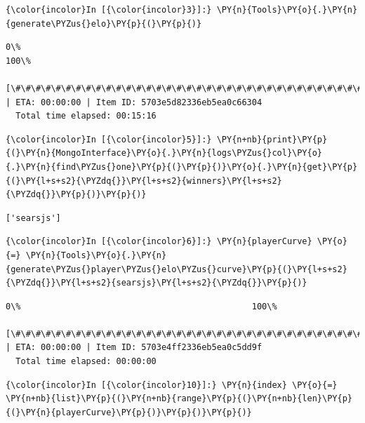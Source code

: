 \begin{Verbatim}[commandchars=\\\{\}]
  {\color{incolor}In [{\color{incolor}3}]:} \PY{n}{Tools}\PY{o}{.}\PY{n}{generate\PYZus{}elo}\PY{p}{(}\PY{p}{)}
\end{Verbatim}

\begin{Verbatim}[commandchars=\\\{\}]
  0\%                                                                  100\%
  [\#\#\#\#\#\#\#\#\#\#\#\#\#\#\#\#\#\#\#\#\#\#\#\#\#\#\#\#\#\#\#\#\#\#\#\#\#\#\#\#\#\#\#\#\#\#\#\#\#\#\#\#\#\#\#\#\#\#\#\#\#\#\#\#\#\#\#\#\#\#] | ETA: 00:00:00 | Item ID: 5703e5d82336eb5ea0c66304
  Total time elapsed: 00:15:16
\end{Verbatim}

\begin{Verbatim}[commandchars=\\\{\}]
  {\color{incolor}In [{\color{incolor}5}]:} \PY{n+nb}{print}\PY{p}{(}\PY{n}{MongoInterface}\PY{o}{.}\PY{n}{logs\PYZus{}col}\PY{o}{.}\PY{n}{find\PYZus{}one}\PY{p}{(}\PY{p}{)}\PY{o}{.}\PY{n}{get}\PY{p}{(}\PY{l+s+s2}{\PYZdq{}}\PY{l+s+s2}{winners}\PY{l+s+s2}{\PYZdq{}}\PY{p}{)}\PY{p}{)}
\end{Verbatim}

\begin{Verbatim}[commandchars=\\\{\}]
  ['searsjs']
\end{Verbatim}

\begin{Verbatim}[commandchars=\\\{\}]
  {\color{incolor}In [{\color{incolor}6}]:} \PY{n}{playerCurve} \PY{o}{=} \PY{n}{Tools}\PY{o}{.}\PY{n}{generate\PYZus{}player\PYZus{}elo\PYZus{}curve}\PY{p}{(}\PY{l+s+s2}{\PYZdq{}}\PY{l+s+s2}{searsjs}\PY{l+s+s2}{\PYZdq{}}\PY{p}{)}
\end{Verbatim}

\begin{Verbatim}[commandchars=\\\{\}]
  0\%                                              100\%
  [\#\#\#\#\#\#\#\#\#\#\#\#\#\#\#\#\#\#\#\#\#\#\#\#\#\#\#\#\#\#\#\#\#\#\#\#\#\#\#\#\#\#\#\#\#\#\#\#\#\#] | ETA: 00:00:00 | Item ID: 5703e4ff2336eb5ea0c5dd9f
  Total time elapsed: 00:00:00
\end{Verbatim}

\begin{Verbatim}[commandchars=\\\{\}]
  {\color{incolor}In [{\color{incolor}10}]:} \PY{n}{index} \PY{o}{=} \PY{n+nb}{list}\PY{p}{(}\PY{n+nb}{range}\PY{p}{(}\PY{n+nb}{len}\PY{p}{(}\PY{n}{playerCurve}\PY{p}{)}\PY{p}{)}\PY{p}{)}
\end{Verbatim}

